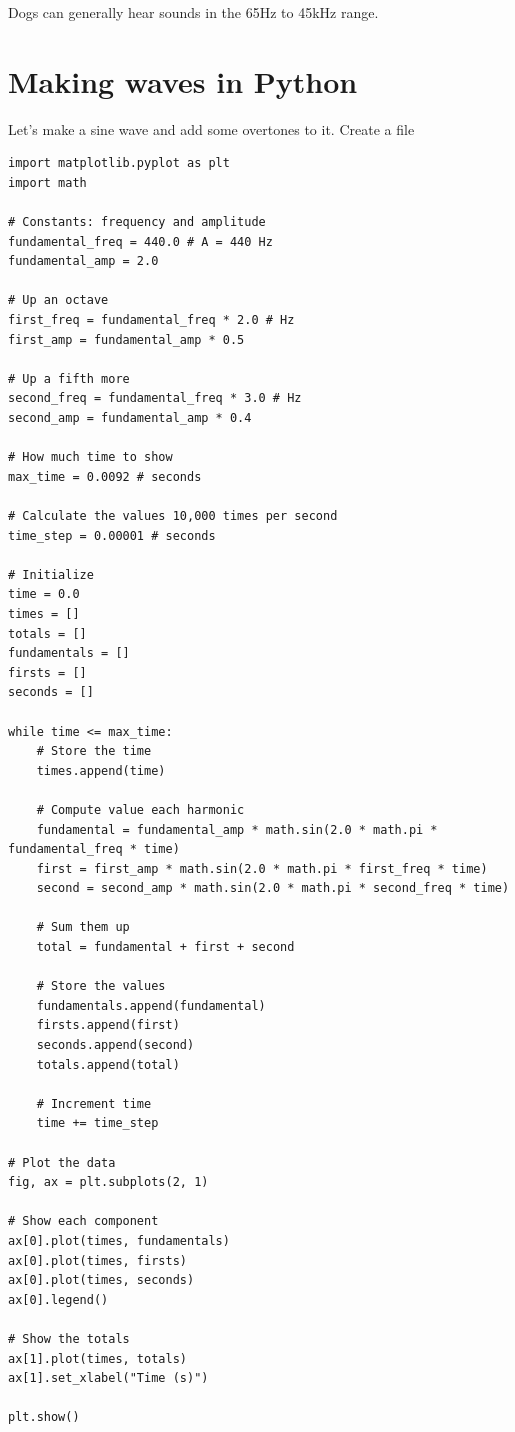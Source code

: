 Dogs can generally hear sounds in the 65Hz to 45kHz range.

\section{Making waves in Python}

Let's make a sine wave and add some overtones to it.  Create a file 

\begin{Verbatim}
import matplotlib.pyplot as plt
import math

# Constants: frequency and amplitude
fundamental_freq = 440.0 # A = 440 Hz
fundamental_amp = 2.0

# Up an octave
first_freq = fundamental_freq * 2.0 # Hz
first_amp = fundamental_amp * 0.5

# Up a fifth more
second_freq = fundamental_freq * 3.0 # Hz
second_amp = fundamental_amp * 0.4

# How much time to show
max_time = 0.0092 # seconds

# Calculate the values 10,000 times per second
time_step = 0.00001 # seconds

# Initialize 
time = 0.0
times = []
totals = []
fundamentals = []
firsts = []
seconds = []

while time <= max_time:
    # Store the time
    times.append(time)
    
    # Compute value each harmonic
    fundamental = fundamental_amp * math.sin(2.0 * math.pi * fundamental_freq * time)
    first = first_amp * math.sin(2.0 * math.pi * first_freq * time)
    second = second_amp * math.sin(2.0 * math.pi * second_freq * time)

    # Sum them up
    total = fundamental + first + second

    # Store the values
    fundamentals.append(fundamental)
    firsts.append(first)
    seconds.append(second)
    totals.append(total)

    # Increment time
    time += time_step

# Plot the data
fig, ax = plt.subplots(2, 1)

# Show each component
ax[0].plot(times, fundamentals)
ax[0].plot(times, firsts)
ax[0].plot(times, seconds)
ax[0].legend()

# Show the totals
ax[1].plot(times, totals)
ax[1].set_xlabel("Time (s)")

plt.show()
\end{Verbatim}

